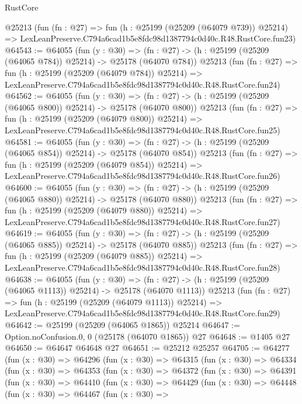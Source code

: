 \begin{lexlean}{RustCore}
\begin{coremodule}
    @25213
    (fun (fn : @27) =>
    fun (h : @25199 (@25209 (@64079 @739)) @25214) =>
    LexLeanPreserve.C794a6cad1b5e8fdc98d1387794c0d40c.R48.RustCore.fun23)
@64543 := @64055
    (fun (y : @30) =>
    (fn : @27) -> (h : @25199 (@25209 (@64065 @784)) @25214) -> @25178 (@64070 @784))
    @25213
    (fun (fn : @27) =>
    fun (h : @25199 (@25209 (@64079 @784)) @25214) =>
    LexLeanPreserve.C794a6cad1b5e8fdc98d1387794c0d40c.R48.RustCore.fun24)
@64562 := @64055
    (fun (y : @30) =>
    (fn : @27) -> (h : @25199 (@25209 (@64065 @800)) @25214) -> @25178 (@64070 @800))
    @25213
    (fun (fn : @27) =>
    fun (h : @25199 (@25209 (@64079 @800)) @25214) =>
    LexLeanPreserve.C794a6cad1b5e8fdc98d1387794c0d40c.R48.RustCore.fun25)
@64581 := @64055
    (fun (y : @30) =>
    (fn : @27) -> (h : @25199 (@25209 (@64065 @854)) @25214) -> @25178 (@64070 @854))
    @25213
    (fun (fn : @27) =>
    fun (h : @25199 (@25209 (@64079 @854)) @25214) =>
    LexLeanPreserve.C794a6cad1b5e8fdc98d1387794c0d40c.R48.RustCore.fun26)
@64600 := @64055
    (fun (y : @30) =>
    (fn : @27) -> (h : @25199 (@25209 (@64065 @880)) @25214) -> @25178 (@64070 @880))
    @25213
    (fun (fn : @27) =>
    fun (h : @25199 (@25209 (@64079 @880)) @25214) =>
    LexLeanPreserve.C794a6cad1b5e8fdc98d1387794c0d40c.R48.RustCore.fun27)
@64619 := @64055
    (fun (y : @30) =>
    (fn : @27) -> (h : @25199 (@25209 (@64065 @885)) @25214) -> @25178 (@64070 @885))
    @25213
    (fun (fn : @27) =>
    fun (h : @25199 (@25209 (@64079 @885)) @25214) =>
    LexLeanPreserve.C794a6cad1b5e8fdc98d1387794c0d40c.R48.RustCore.fun28)
@64638 := @64055
    (fun (y : @30) =>
    (fn : @27) -> (h : @25199 (@25209 (@64065 @1113)) @25214) -> @25178 (@64070 @1113))
    @25213
    (fun (fn : @27) =>
    fun (h : @25199 (@25209 (@64079 @1113)) @25214) =>
    LexLeanPreserve.C794a6cad1b5e8fdc98d1387794c0d40c.R48.RustCore.fun29)
@64642 := @25199 (@25209 (@64065 @1865)) @25214
@64647 := Option.noConfusion.{0, 0} (@25178 (@64070 @1865)) @27
@64648 := @1405 @27
@64650 := @64647 @64648 @27
@64651 := @25212 @25257
@64705 := @64277
    (fun (x : @30) =>
    @64296
      (fun (x : @30) =>
      @64315
        (fun (x : @30) =>
        @64334
          (fun (x : @30) =>
          @64353
            (fun (x : @30) =>
            @64372
              (fun (x : @30) =>
              @64391
                (fun (x : @30) =>
                @64410
                  (fun (x : @30) =>
                  @64429
                    (fun (x : @30) =>
                    @64448
                      (fun (x : @30) =>
                      @64467
                        (fun (x : @30) =>

\end{coremodule}
\end{lexlean}
